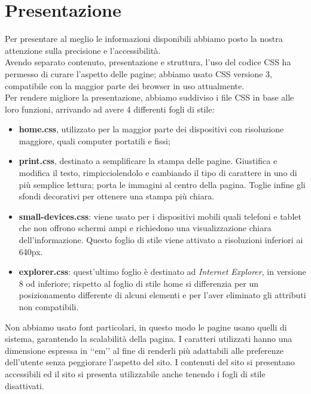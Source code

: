 \section{Presentazione}{
	Per presentare al meglio le informazioni disponibili abbiamo posto la nostra attenzione sulla precisione e l'accessibilità.\\
	Avendo separato contenuto, presentazione e struttura, l'uso del codice CSS ha permesso di curare l'aspetto delle pagine; abbiamo usato CSS versione 3, compatibile con la maggior parte dei browser in uso attualmente.\\
	Per rendere migliore la presentazione, abbiamo suddiviso i file CSS in base alle loro funzioni, arrivando ad avere 4 differenti fogli di stile:
	\begin{itemize}
		\item \textbf{home.css}, utilizzato per la maggior parte dei dispositivi con risoluzione maggiore, quali computer portatili e fissi;
		\item \textbf{print.css}, destinato a semplificare la stampa delle pagine.
		Giustifica e modifica il testo, rimpicciolendolo e cambiando il tipo di carattere in uno di più semplice lettura; porta le immagini al centro della pagina. Toglie infine gli sfondi decorativi per ottenere una stampa più chiara.
		\item \textbf{small-devices.css}: viene usato per i dispositivi mobili quali telefoni e tablet che non offrono schermi ampi e richiedono una visualizzazione chiara dell'informazione. Questo foglio di stile viene attivato a risoluzioni inferiori ai 640px.
		\item \textbf{explorer.css}: quest'ultimo foglio è destinato ad \textit{Internet Explorer}, in versione 8 od inferiore; rispetto al foglio di stile home si differenzia per un posizionamento differente di alcuni elementi e per l'aver eliminato gli attributi non compatibili.
	\end{itemize}
	Non abbiamo usato font particolari, in questo modo le pagine usano quelli di sistema, garantendo la scalabilità della pagina. I caratteri utilizzati hanno una dimensione espressa in ‘‘em’’ al fine di renderli più adattabili alle preferenze dell'utente senza peggiorare l'aspetto del sito.
	I contenuti del sito si presentano accessibili ed il sito si presenta utilizzabile anche tenendo i fogli di stile disattivati.
}